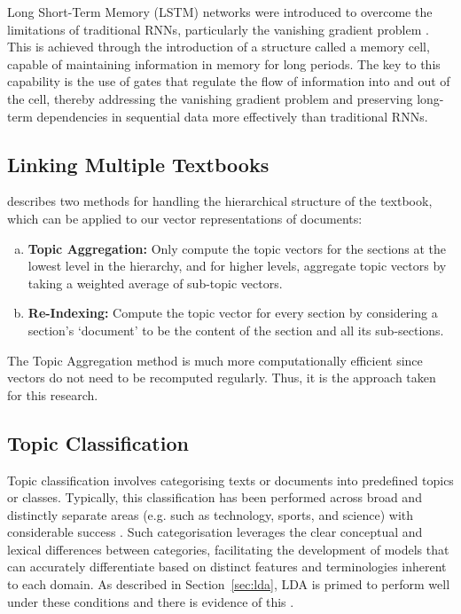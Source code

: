 \documentclass[twocolumn]{article}
\begin{document}
Long Short-Term Memory (LSTM) networks were introduced to overcome the limitations of traditional RNNs, particularly the vanishing gradient problem \cite{hochreiter1997}. This is achieved through the introduction of a structure called a memory cell, capable of maintaining information in memory for long periods. The key to this capability is the use of gates that regulate the flow of information into and out of the cell, thereby addressing the vanishing gradient problem and preserving long-term dependencies in sequential data more effectively than traditional RNNs. 

\subsection{Linking Multiple Textbooks}

\textcite{guerra2013} describes two methods for handling the hierarchical structure of the textbook, which can be applied to our vector representations of documents:
\begin{enumerate}[a)]
    \item \textbf{Topic Aggregation:} Only compute the topic vectors for the sections at the lowest level in the hierarchy, and for higher levels, aggregate topic vectors by taking a weighted average of sub-topic vectors.
    \item \textbf{Re-Indexing:} Compute the topic vector for every section by considering a section's `document' to be the content of the section and all its sub-sections.
\end{enumerate}

The Topic Aggregation method is much more computationally efficient since vectors do not need to be recomputed regularly. Thus, it is the approach taken for this research.

\subsection{Topic Classification}


Topic classification involves categorising texts or documents into predefined topics or classes. Typically, this classification has been performed across broad and distinctly separate areas (e.g. such as technology, sports, and science) with considerable success \cite{lee2011}. Such categorisation leverages the clear conceptual and lexical differences between categories, facilitating the development of models that can accurately differentiate based on distinct features and terminologies inherent to each domain. As described in Section~\ref{sec:lda}, LDA is primed to perform well under these conditions and there is evidence of this \cites{lancichinetti2014, li2016}.
\end{document}
